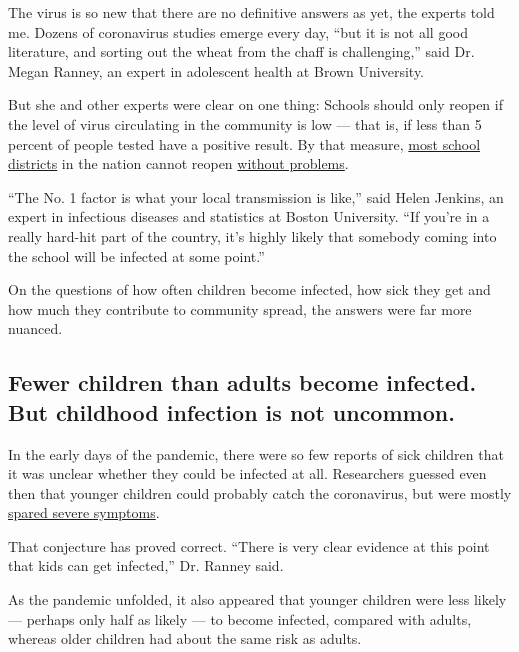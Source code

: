The virus is so new that there are no definitive answers as yet, the
experts told me. Dozens of coronavirus studies emerge every day, ``but
it is not all good literature, and sorting out the wheat from the chaff
is challenging,'' said Dr. Megan Ranney, an expert in adolescent health
at Brown University.

But she and other experts were clear on one thing: Schools should only
reopen if the level of virus circulating in the community is low ---
that is, if less than 5 percent of people tested have a positive result.
By that measure,
\href{https://www.nytimes3xbfgragh.onion/2020/07/14/us/coronavirus-schools-fall.html}{most
school districts} in the nation cannot reopen
\href{https://www.nytimes3xbfgragh.onion/2020/08/12/us/georgia-school-coronavirus.html}{without
problems}.

``The No. 1 factor is what your local transmission is like,'' said Helen
Jenkins, an expert in infectious diseases and statistics at Boston
University. ``If you're in a really hard-hit part of the country, it's
highly likely that somebody coming into the school will be infected at
some point.''

On the questions of how often children become infected, how sick they
get and how much they contribute to community spread, the answers were
far more nuanced.

\hypertarget{fewer-children-than-adults-become-infected-but-childhood-infection-is-not-uncommon}{%
\subsection{Fewer children than adults become infected. But childhood
infection is not
uncommon.}\label{fewer-children-than-adults-become-infected-but-childhood-infection-is-not-uncommon}}

In the early days of the pandemic, there were so few reports of sick
children that it was unclear whether they could be infected at all.
Researchers guessed even then that younger children could probably catch
the coronavirus, but were mostly
\href{https://www.nytimes3xbfgragh.onion/2020/02/05/health/coronavirus-children.html}{spared
severe symptoms}.

That conjecture has proved correct. ``There is very clear evidence at
this point that kids can get infected,'' Dr. Ranney said.

As the pandemic unfolded, it also appeared that younger children were
less likely --- perhaps only half as likely --- to become infected,
compared with adults, whereas older children had about the same risk as
adults.

